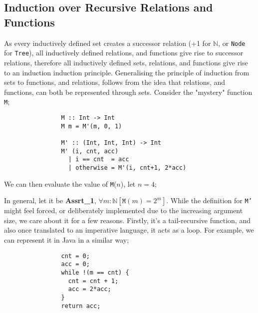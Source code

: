 \documentclass[a4paper, 12pt]{article}
\newcommand{\proofeq}[3]{$#1$ & = $#2$ & \hfill #3 \smallskip \\}
\begin{document}
        \subsection*{Induction over Recursive Relations and Functions}
            As every inductively defined set creates a successor relation (+1 for $\mathbb{N}$, or \texttt{Node} for \texttt{Tree}), all inductively defined relations, and functions give rise to successor relations, therefore all inductively defined sets, relations, and functions give rise to an induction induction principle. Generalising the principle of induction from sets to functions, and relations, follows from the idea that relations, and functions, can both be represented through sets. Consider the "mystery" function \texttt{M};
            \begin{lstlisting}
                M :: Int -> Int
                M m = M'(m, 0, 1)

                M' :: (Int, Int, Int) -> Int
                M' (i, cnt, acc)
                  | i == cnt  = acc
                  | otherwise = M'(i, cnt+1, 2*acc)
            \end{lstlisting}
            We can then evaluate the value of \texttt{M}($n$), let $n = 4$;
            In general, let it be \textbf{Assrt\_1}, $\forall m : \mathbb{N} [\texttt{M}(m) = 2^m]$. While the definition for \texttt{M'} might feel forced, or deliberately implemented due to the increasing argument size, we care about it for a few reasons. Firstly, it's a tail-recursive function, and also once translated to an imperative language, it acts as a loop. For example, we can represent it in Java in a similar way;
            \begin{lstlisting}
                cnt = 0;
                acc = 0;
                while !(m == cnt) {
                  cnt = cnt + 1;
                  acc = 2*acc;
                }
                return acc;
            \end{lstlisting}
\end{document}
